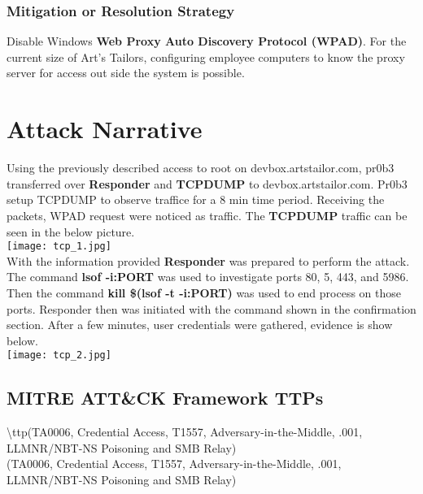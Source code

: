 \documentclass[notitlepage]{article}
\begin{document}
	\subsubsection{Mitigation or Resolution Strategy}
	\indent Disable Windows \textbf{Web Proxy Auto Discovery Protocol (WPAD)}. For the current size of Art's Tailors, configuring employee computers to know the proxy server for access out side the system is possible.\\
	   
	\section{Attack Narrative}
	\indent Using the previously described access to root on devbox.artstailor.com, pr0b3 transferred over \textbf{Responder} and \textbf{TCPDUMP} to devbox.artstailor.com.  Pr0b3 setup TCPDUMP to observe traffice for a 8 min time period. Receiving the packets, WPAD request were noticed as traffic. The \textbf{TCPDUMP} traffic can be seen in the below picture. \\

	\texttt{[image: tcp\_1.jpg]}
	\\
	\indent With the information provided \textbf{Responder} was prepared to perform the attack. The command \textbf{lsof -i:PORT} was used to investigate ports 80, 5, 443, and 5986. Then the command \textbf{kill \$(lsof -t -i:PORT)} was used to end process on those ports. Responder then was initiated with the command shown in the confirmation section. After a few minutes, user credentials were gathered, evidence is show below.\\
	
	
	
	\texttt{[image: tcp\_2.jpg]}
	
	\subsection{MITRE ATT{\&}CK Framework TTPs}
	
	\indent\textbackslash ttp(TA0006, Credential Access, T1557, Adversary-in-the-Middle, .001, LLMNR/NBT-NS Poisoning and SMB Relay) \\
	\ttp(TA0006, Credential Access, T1557, Adversary-in-the-Middle, .001, LLMNR/NBT-NS Poisoning and SMB Relay) \\
	
\end{document}
